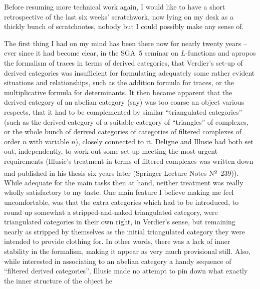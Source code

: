 \bigbreak

\noindent\hfill{}\par

\label{sec:69}%
Before resuming more technical work again, I would like to have a
short retrospective of the last six weeks' scratchwork, now lying on
my desk as a thickly bunch of scratchnotes, nobody but I could
possibly make any sense of.

The first thing I had on my mind has been there now for nearly twenty
years -- ever since it had become clear, in the SGA~5 seminar on
$L$-functions and apropos the formalism of traces in terms of derived
categories, that Verdier's set-up of derived categories was
insufficient for formulating adequately some rather evident situations
and relationships, such as the addition formula for traces, or the
multiplicative formula for determinants. It then became apparent that
the derived category of an abelian category (say) was too coarse an
object various respects, that it had to be complemented by similar
``triangulated categories'' (such as the derived category of a
suitable category of ``triangles'' of complexes, or the whole bunch of
derived categories of categories of filtered complexes of order $n$
with variable $n$), closely connected to it. Deligne and Illusie had
both set out, independently, to work out some set-up meeting the most
urgent requirements (Illusie's treatment in terms of filtered
complexes was written down and published in his thesis six years later
(Springer Lecture Notes N\textsuperscript{\b o}~239)).%
While adequate for the main tasks then at hand, neither treatment was
really wholly satisfactory to my taste. One main feature I believe
making me feel uncomfortable, was that the extra categories which had
to be introduced, to round up somewhat a stripped-and-naked
triangulated category, were triangulated categories in their own
right, in Verdier's sense, but remaining nearly as stripped by
themselves as the initial triangulated category they were intended to
provide clothing for. In other words, there was a lack of inner
stability in the formalism, making it appear as very much provisional
still. Also, while interested in associating to an abelian category a
handy sequence of ``filtered derived categories'', Illusie made no
attempt to pin down what exactly the inner structure of the object he
